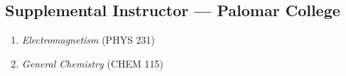 \vspace*{\subsectionskip}

\subsection{Supplemental Instructor --- Palomar College}	
\begin{enumerate}[label={\arabic*.}]
	\item \textit{Electromagnetism} (PHYS 231) 
	\item \textit{General Chemistry} (CHEM 115) 
\end{enumerate}

